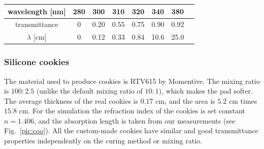 \begin{center}
\begin{tabular}{| c | c | c | c | c | c | c | c |}
\hline
wavelength [nm] & 280 & 300 & 310 & 320 & 340 & 380 \\
\hline
transmittance & 0 & 0.20 & 0.55 & 0.75 & 0.90 & 0.92 \\
\hline
$\lambda$ [cm] & 0 & 0.12 & 0.33 & 0.84 & 10.6 & 25.0 \\
\hline
\end{tabular}
\end{center}

\subsubsection*{Silicone cookies}

The material used to produce cookies is RTV615 by Momentive. The mixing ratio is $100 : 2.5$ (unlike the default mixing ratio of $10 : 1$), which makes the pad softer. The average thickness of the real cookies is $0.17$ cm, and the area is $5.2$ cm times $15.8$ cm. For the simulation the refraction index of the cookies is set constant $n = 1.406$, and the absorption length is taken from our measurements (see Fig.~\ref{pic:coo}). All the custom-made cookies have similar and good transmittance properties independently on the curing method or mixing ratio.


